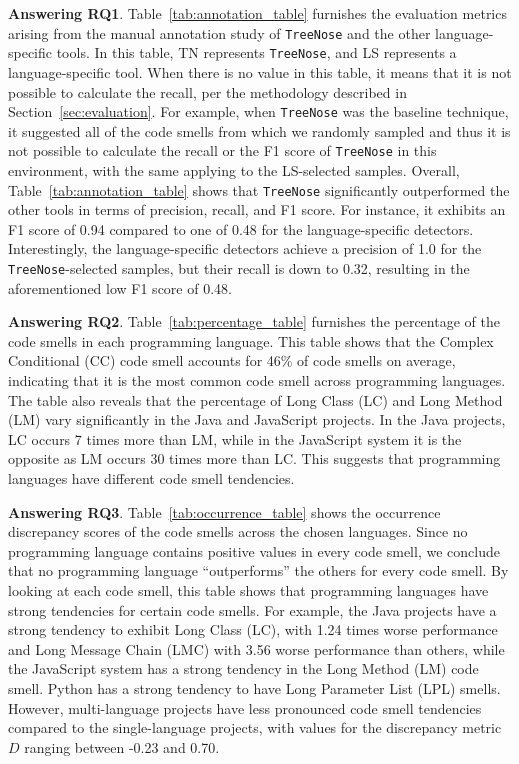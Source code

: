 


{\bf Answering RQ1}. Table~\ref{tab:annotation_table} furnishes the evaluation
metrics arising from the manual annotation study of \texttt{TreeNose} and the
other language-specific tools.
%
In this table, TN represents \texttt{TreeNose}, and LS represents a
language-specific tool.
%
When there is no value in this table, it means that it is not possible to
calculate the recall, per the methodology described in
Section~\ref{sec:evaluation}.
%
For example, when \texttt{TreeNose} was the baseline technique, it suggested
all of the code smells from which we randomly sampled and thus it is not
possible to calculate the recall or the F1 score of \texttt{TreeNose} in this
environment, with the same applying to the LS-selected samples.
%
Overall, Table~\ref{tab:annotation_table} shows that \texttt{TreeNose}
significantly outperformed the other tools in terms of precision, recall, and
F1 score.
%
For instance, it exhibits an F1 score of 0.94 compared to one of 0.48 for the
language-specific detectors.
%
Interestingly, the language-specific detectors achieve a precision of 1.0 for
the \texttt{TreeNose}-selected samples, but their recall is down to 0.32,
resulting in the aforementioned low F1 score of 0.48.


{\bf Answering RQ2}. Table~\ref{tab:percentage_table} furnishes the percentage
of the code smells in each programming language. This table shows that the
Complex Conditional (CC) code smell accounts for 46\% of code smells on
average, indicating that it is the most common code smell across programming
languages.
%
The table also reveals that the percentage of Long Class (LC) and Long Method
(LM) vary significantly in the Java and JavaScript projects. In the Java
projects, LC occurs 7 times more than LM, while in the JavaScript system it is
the opposite as LM occurs 30 times more than LC. This suggests that programming
languages have different code smell tendencies.

{\bf Answering RQ3}. Table~\ref{tab:occurrence_table} shows the occurrence
discrepancy scores of the code smells across the chosen languages. Since no
programming language contains positive values in every code smell, we conclude
that no programming language ``outperforms'' the others for every code smell.
By looking at each code smell, this table shows that programming languages have
strong tendencies for certain code smells.
%
For example, the Java projects have a strong tendency to exhibit Long Class
(LC), with 1.24 times worse performance and Long Message Chain (LMC) with 3.56
worse performance than others, while the JavaScript system has a strong
tendency in the Long Method (LM) code smell. Python has a strong tendency to
have Long Parameter List (LPL) smells. However, multi-language projects have
less pronounced code smell tendencies compared to the single-language projects,
with values for the discrepancy metric $D$ ranging between -0.23 and 0.70.
